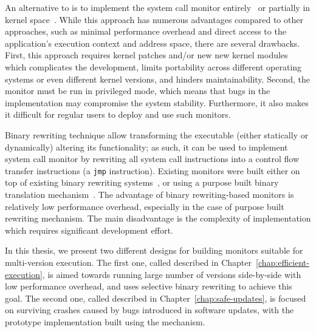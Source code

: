 
An alternative to \ptrace is to implement the system call monitor
entirely~\cite{provos2002,cox2006} or partially in kernel space~\cite{ostia}.
While this approach has numerous advantages compared to other approaches, such
as minimal performance overhead and direct access to the application's
execution context and address space, there are several drawbacks.  First, this
approach requires kernel patches and/or new new kernel modules which
complicates the development, limits portability across different operating
systems or even different kernel versions, and hinders maintainability. Second,
the monitor must be run in privileged mode, which means that bugs in the
implementation may compromise the system stability. Furthermore, it also makes
it difficult for regular users to deploy and use such monitors.

Binary rewriting technique allow transforming the executable (either statically
or dynamically) altering its functionality; as such, it can be used to
implement system call monitor by rewriting all system call instructions into a
control flow transfer instructions (\eg a
\lstinline[language={[x64]Assembler}]`jmp` instruction). Existing monitors were
built either on top of existing binary rewriting
systems~\cite{onlinevalidation}, or using a purpose built binary translation
mechanism~\cite{vx32}. The advantage of binary rewriting-based monitors is
relatively low performance overhead, especially in the case of purpose built
rewriting mechanism. The main disadvantage is the complexity of implementation
which requires significant development effort.

In this thesis, we present two different designs for building monitors suitable
for multi-version execution. The first one, called \varan described in
Chapter~\ref{chap:efficient-execution}, is aimed towards running large number
of versions side-by-side with low performance overhead, and uses selective
binary rewriting to achieve this goal. The second one, called \mx described in
Chapter~\ref{chap:safe-updates}, is focused on surviving crashes caused by bugs
introduced in software updates, with the prototype implementation built using
the \ptrace mechanism.

